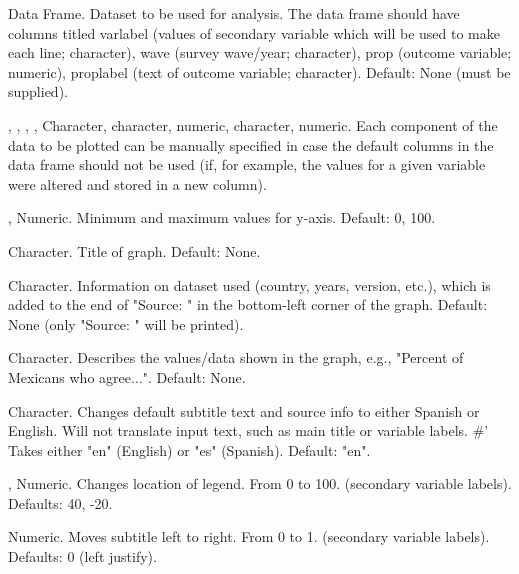 \documentclass[a4paper]{book}
\begin{document}
\begin{Arguments}
\begin{ldescription}
\item[\code{data}] Data Frame. Dataset to be used for analysis.  The data frame should have columns
titled varlabel (values of secondary variable which will be used to make each line; character),
wave (survey wave/year; character), prop (outcome variable; numeric),
proplabel (text of outcome variable; character). Default: None (must be supplied).

\item[\code{varlabel}, \code{wave\_var}, \code{outcome\_var}, \code{label\_var}, \code{point\_var}] Character,
character, numeric, character, numeric. Each component of the data to be plotted
can be manually specified in case the default columns in the data frame should
not be used (if, for example, the values for a given variable were altered
and stored in a new column).

\item[\code{ymin}, \code{ymax}] Numeric.  Minimum and maximum values for y-axis. Default: 0, 100.

\item[\code{main\_title}] Character.  Title of graph.  Default: None.

\item[\code{source\_info}] Character.  Information on dataset used (country, years, version, etc.),
which is added to the end of "Source: " in the bottom-left corner of the graph.
Default: None (only "Source: " will be printed).

\item[\code{subtitle}] Character.  Describes the values/data shown in the graph, e.g., "Percent of Mexicans who agree...".
Default: None.

\item[\code{lang}] Character.  Changes default subtitle text and source info to either Spanish or English.
Will not translate input text, such as main title or variable labels.  \#' Takes either "en" (English)
or "es" (Spanish).  Default: "en".

\item[\code{legend\_h\_just}, \code{legend\_v\_just}] Numeric.  Changes location of legend. From 0 to 100.
(secondary variable labels).  Defaults: 40, -20.

\item[\code{subtitle\_h\_just}] Numeric.  Moves subtitle left to right.  From 0 to 1.
(secondary variable labels).  Defaults: 0 (left justify).


\end{ldescription}
\end{Arguments}
\end{document}
